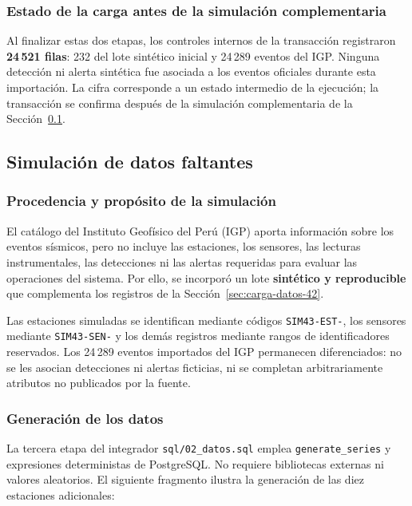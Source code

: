 \documentclass[12pt,a4paper]{article}
\begin{document}
\subsubsection*{Estado de la carga antes de la simulación complementaria}

Al finalizar estas dos etapas, los controles internos de la transacción
registraron \textbf{24\,521 filas}: 232 del lote sintético inicial y
24\,289 eventos del IGP. Ninguna detección ni alerta sintética fue
asociada a los eventos oficiales durante esta importación. La cifra
corresponde a un estado intermedio de la ejecución; la transacción se
confirma después de la simulación complementaria de la
Sección~\ref{sec:simulacion-43}.

\subsection{Simulación de datos faltantes}\label{sec:simulacion-43}

\subsubsection*{Procedencia y propósito de la simulación}

El catálogo del Instituto Geofísico del Perú (IGP) aporta información
sobre los eventos sísmicos, pero no incluye las estaciones, los sensores,
las lecturas instrumentales, las detecciones ni las alertas requeridas
para evaluar las operaciones del sistema. Por ello, se incorporó un lote
\textbf{sintético y reproducible} que complementa los registros de la
Sección~\ref{sec:carga-datos-42}.

Las estaciones simuladas se identifican mediante códigos
\texttt{SIM43-EST-}, los sensores mediante \texttt{SIM43-SEN-} y
los demás registros mediante rangos de identificadores reservados.
Los 24\,289 eventos importados del IGP permanecen diferenciados:
no se les asocian detecciones ni alertas ficticias, ni se completan
arbitrariamente atributos no publicados por la fuente.

\subsubsection*{Generación de los datos}

La tercera etapa del integrador \nolinkurl{sql/02_datos.sql} emplea
\texttt{generate\_series} y expresiones deterministas de PostgreSQL.
No requiere bibliotecas externas ni valores aleatorios. El siguiente
fragmento ilustra la generación de las diez estaciones adicionales:
\end{document}
